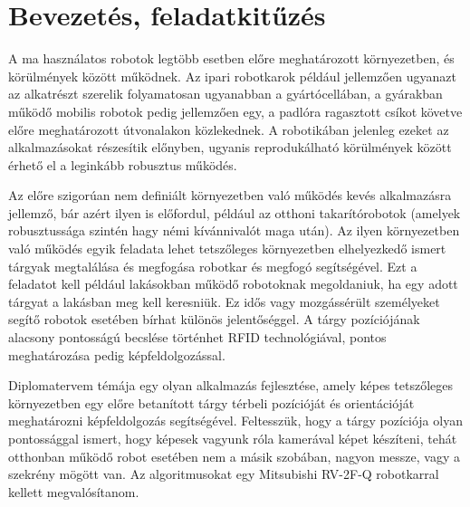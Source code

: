 \chapter{Bevezetés, feladatkitűzés}

%

A ma használatos robotok legtöbb esetben előre meghatározott környezetben, és körülmények között működnek. Az ipari robotkarok például jellemzően ugyanazt az alkatrészt szerelik folyamatosan ugyanabban a gyártócellában, a gyárakban működő mobilis robotok pedig jellemzően egy, a padlóra ragasztott csíkot követve előre meghatározott útvonalakon közlekednek. A robotikában jelenleg ezeket az alkalmazásokat részesítik előnyben, ugyanis reprodukálható körülmények között érhető el a leginkább robusztus működés.

Az előre szigorúan nem definiált környezetben való működés kevés alkalmazásra jellemző, bár azért ilyen is előfordul, például az otthoni takarítórobotok (amelyek robusztussága szintén hagy némi kívánnivalót maga után). Az ilyen környezetben való működés egyik feladata lehet tetszőleges környezetben elhelyezkedő ismert tárgyak megtalálása és megfogása robotkar és megfogó segítségével. Ezt a feladatot kell például lakásokban működő robotoknak megoldaniuk, ha egy adott tárgyat a lakásban meg kell keresniük. Ez idős vagy mozgássérült személyeket segítő robotok esetében bírhat különös jelentőséggel. A tárgy pozíciójának alacsony pontosságú becslése történhet RFID technológiával, pontos meghatározása pedig képfeldolgozással.

Diplomatervem témája egy olyan alkalmazás fejlesztése, amely képes tetszőleges környezetben egy előre betanított tárgy térbeli pozícióját és orientációját meghatározni képfeldolgozás segítségével. Feltesszük, hogy a tárgy pozíciója olyan pontossággal ismert, hogy képesek vagyunk róla kamerával képet készíteni, tehát otthonban működő robot esetében nem a másik szobában, nagyon messze, vagy a szekrény mögött van. Az algoritmusokat egy Mitsubishi RV-2F-Q robotkarral kellett megvalósítanom.

